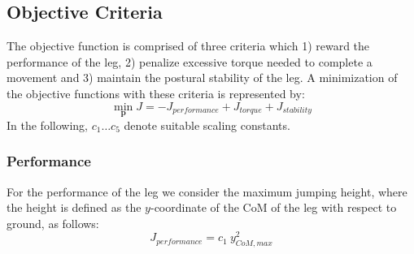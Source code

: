 \documentclass[letterpaper, 10 pt, conference]{ieeeconf}  %
\begin{document}
\subsection{Objective Criteria}
The objective function is comprised of three criteria which 1) reward the performance of the leg, 2) penalize excessive torque needed to complete a movement and 3) maintain the postural stability of the leg. A minimization of the objective functions with these criteria is represented by:
\begin{equation}
	\min_{\mathbf{p}} J = -J_{performance} + J_{torque} + J_{stability}
\end{equation}
In the following, $c_1 \dots c_5$ denote suitable scaling constants.

\subsubsection{Performance}
For the performance of the leg we consider the maximum jumping height, where the height is defined as the $y$-coordinate of the CoM of the leg with respect to ground, as follows:
\begin{equation}
	J_{performance} = c_1 \: y_{CoM,max}^2
\end{equation}

\end{document}
